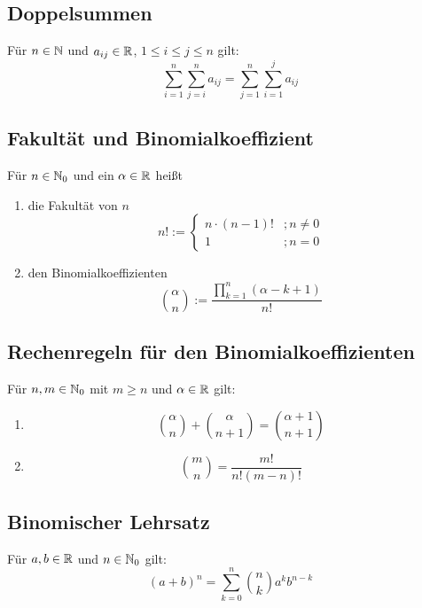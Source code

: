 \subsection{Doppelsummen}
Für $n \in \mathbb{N}$ und $a_{ij} \in \mathbb{R}$, $1 \leq i \leq j \leq n$ gilt:
\begin{equation*}
    \sum_{i=1}^n \sum_{j=i}^n a_{ij} = \sum_{j=1}^n \sum_{i=1}^j a_{ij}
\end{equation*}

\subsection{Fakultät und Binomialkoeffizient}
Für $n \in \mathbb{N}_0$ und ein $\alpha \in \mathbb{R}$ heißt
\begin{enumerate}[label= (\alph*)]
    \item die Fakultät von $n$
        \begin{equation*}
            n! := \begin{cases}
                n \cdot (n-1)!&;n \neq 0\\
                1&;n=0
            \end{cases}
        \end{equation*}
    \item den Binomialkoeffizienten
        \begin{equation*}
            {\alpha \choose n} := \frac{\prod\limits_{k=1}^n (\alpha-k+1)}{n!}
        \end{equation*}
\end{enumerate}

\subsection{Rechenregeln für den Binomialkoeffizienten}
Für $n, m \in \mathbb{N}_0$ mit $m \geq n$ und $\alpha \in \mathbb{R}$ gilt:
\begin{enumerate}[label= (\alph*)]
    \item
        \begin{equation*}
            {\alpha \choose n} + {\alpha \choose n+1} =
            {\alpha + 1 \choose n +1}
        \end{equation*}
     \item
        \begin{equation*}
            {m \choose n} = \frac{m!}{n!(m-n)!}
        \end{equation*}
\end{enumerate}

\subsection{Binomischer Lehrsatz}
Für $a, b \in \mathbb{R}$ und $n \in \mathbb{N}_0$ gilt:
\begin{equation*}
    {(a+b)}^n = \sum_{k=0}^n {n \choose k} a^k b^{n-k}
\end{equation*}

